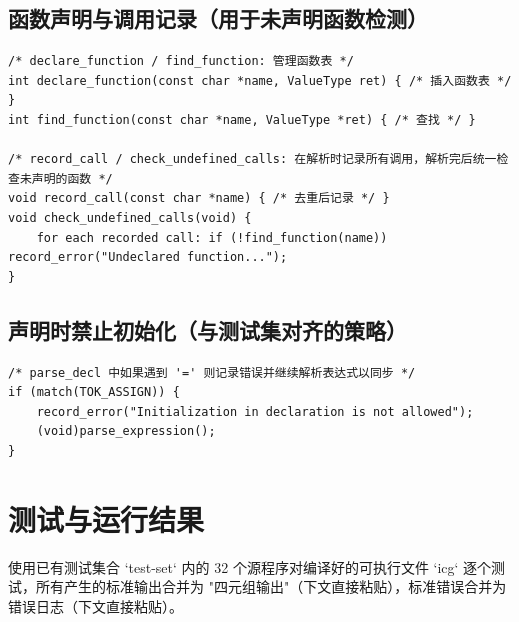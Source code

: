 \documentclass[12pt,a4paper]{ctexart}
\begin{document}
\subsection{函数声明与调用记录（用于未声明函数检测）}
\begin{lstlisting}
/* declare_function / find_function: 管理函数表 */
int declare_function(const char *name, ValueType ret) { /* 插入函数表 */ }
int find_function(const char *name, ValueType *ret) { /* 查找 */ }

/* record_call / check_undefined_calls: 在解析时记录所有调用，解析完后统一检查未声明的函数 */
void record_call(const char *name) { /* 去重后记录 */ }
void check_undefined_calls(void) {
	for each recorded call: if (!find_function(name)) record_error("Undeclared function...");
}
\end{lstlisting}

\subsection{声明时禁止初始化（与测试集对齐的策略）}
\begin{lstlisting}
/* parse_decl 中如果遇到 '=' 则记录错误并继续解析表达式以同步 */
if (match(TOK_ASSIGN)) {
	record_error("Initialization in declaration is not allowed");
	(void)parse_expression();
}
\end{lstlisting}

\section{测试与运行结果}
使用已有测试集合 `test-set` 内的 32 个源程序对编译好的可执行文件 `icg` 逐个测试，所有产生的标准输出合并为 "四元组输出"（下文直接粘贴），标准错误合并为错误日志（下文直接粘贴）。
\end{document}
